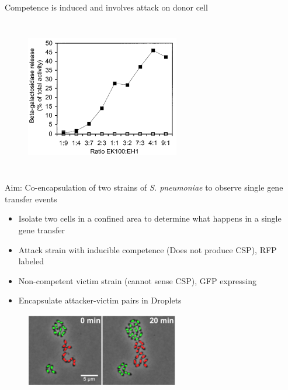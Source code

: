 \documentclass{beamer}
\begin{document}
\begin{frame}{Competence is induced and involves attack on donor cell}
\begin{columns}[c]
\begin{figure}
\includegraphics[width=0.6\linewidth]{images/beta-g-ratio.png}\\
\hspace*{11pt}\hbox{\scriptsize {}}
\end{figure}
\end{columns}
\end{frame}

\begin{frame}{Aim: Co-encapsulation of two strains of \textit{S. pneumoniae} to observe single gene transfer events}
\begin{itemize}
\item Isolate two cells in a confined area to determine what happens in a single gene transfer
\item Attack strain with inducible competence (Does not produce CSP), RFP labeled
\item Non-competent victim strain (cannot sense CSP), GFP expressing
\item Encapsulate attacker-victim pairs in Droplets
\end{itemize}
\begin{figure}
\includegraphics[width=0.5\linewidth]{images/red-green.png}\\
\hspace*{11pt}\hbox{\scriptsize {}}
\end{figure}
\end{frame}
\end{document}
